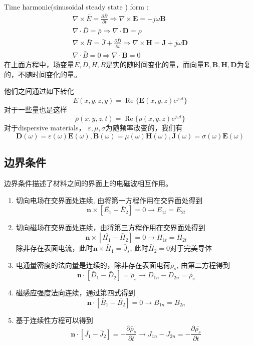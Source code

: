\documentclass{article}
\newcommand{\tmmathbf}[1]{\ensuremath{\boldsymbol{#1}}}
\newcommand{\tmop}[1]{\ensuremath{\operatorname{#1}}}
\begin{document}
\begin{CJK*}{UTF8}{gbsn}
Time harmonic(sinusoidal steady state ) form :
\[ \begin{array}{c}
     \nabla \times \bar{E} = \frac{\partial \bar{B}}{\partial t} \Rightarrow
     \nabla \times \tmmathbf{E}= - j \omega \tmmathbf{B}\\
     \nabla \cdot \bar{D} = \bar{\rho} \Rightarrow \nabla \cdot \tmmathbf{D}=
     \rho\\
     \nabla \times \bar{H} = \bar{J} + \frac{\partial \bar{D}}{\partial t}
     \Rightarrow \nabla \times \tmmathbf{H}=\tmmathbf{J}+ j \omega
     \tmmathbf{D}\\
     \nabla \cdot \bar{B} = 0 \Rightarrow \nabla \cdot \tmmathbf{B}= 0
   \end{array} \]
在上面方程中，场变量$\bar{E}, \bar{D}, \bar{H},
\bar{B}$是实的随时间变化的量，而向量$\tmmathbf{E}, \tmmathbf{B},
\tmmathbf{H}, \tmmathbf{D}$为复的，不随时间变化的量。

他们之间通过如下转化
\[ E (x, y, z, y) = \tmop{Re} \{ \tmmathbf{E} (x, y, z) e^{j \omega t} \} \]
对于一些量也是这样
\[ \bar{\rho} (x, y, z, t) = \tmop{Re} \{ \rho (x, y, z) e^{j \omega t} \} \]
对于dispersive materials， $\varepsilon, \mu,
\sigma$为随频率改变的，我们有
\[ \tmmathbf{D} (\omega) = \varepsilon (\omega) \tmmathbf{E} (\omega),
   \tmmathbf{B} (\omega) = \mu (\omega) \tmmathbf{H} (\omega), \tmmathbf{J}
   (\omega) = \sigma (\omega) \tmmathbf{E} (\omega) \]

\subsection{边界条件}

边界条件描述了材料之间的界面上的电磁波相互作用。
\begin{enumerate}
  \item 切向电场在交界面处连续,
  由将第一方程作用在交界面处得到
  \[ \tmmathbf{n} \times [\overline{E_1} - \bar{E}_2] = 0 \rightarrow E_{1 t}
     = E_{2 t} \]
  \item
  切向磁场在交界面处连续，由将第三方程作用在交界面处得到
  \[ \tmmathbf{n} \times [\overline{H_1} - \bar{H}_2] = 0 \rightarrow H_{1 t}
     = H_{2 t} \]
  除非存在表面电流，此时$\tmmathbf{n} \times \bar{H}_1 =
  \bar{J}_s$, 此时$\bar{H}_2 = 0$对于完美导体
  
  \item
  电通量密度的法向量是连续的，除非存在表面电荷$\tilde{\rho}_s$,
  由第二方程得到
  \[ \tmmathbf{n} \cdot [\bar{D}_1 - \bar{D}_2] = \tilde{\rho}_s \rightarrow
     D_{1 n} - D_{2 n} = \widetilde{\rho_s} \]
  \item 磁感应强度法向连续，通过第四式得到
  \[ \tmmathbf{n} \cdot [\bar{B}_1 - \overline{B_2}] = 0 \rightarrow B_{1 n} =
     B_{2 n} \]
  \item 基于连续性方程可以得到
  \[ \tmmathbf{n} \cdot [\overline{J_1} - \bar{J}_2] = - \frac{\partial
     \bar{\rho}_s}{\partial t} \rightarrow J_{1 n} - J_{2 n} = -
     \frac{\partial \overline{\rho_s}}{\partial t} \]
  

\end{enumerate}
\end{CJK*}
\end{document}
